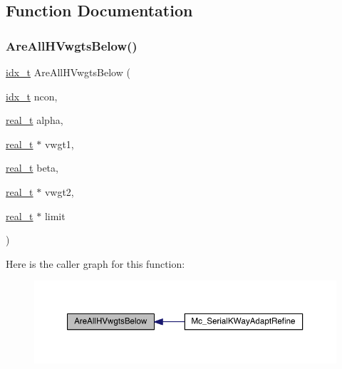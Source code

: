 \subsection{Function Documentation}
\mbox{\label{a00407_ace02f7278bd27e41cf76dd1d4bac9a80}} 
\subsubsection{\texorpdfstring{Are\+All\+H\+Vwgts\+Below()}{AreAllHVwgtsBelow()}}
{\footnotesize\ttfamily \hyperlink{a00876_aaa5262be3e700770163401acb0150f52}{idx\+\_\+t} Are\+All\+H\+Vwgts\+Below (\begin{DoxyParamCaption}\item[{\hyperlink{a00876_aaa5262be3e700770163401acb0150f52}{idx\+\_\+t}}]{ncon,  }\item[{\hyperlink{a00876_a1924a4f6907cc3833213aba1f07fcbe9}{real\+\_\+t}}]{alpha,  }\item[{\hyperlink{a00876_a1924a4f6907cc3833213aba1f07fcbe9}{real\+\_\+t} $\ast$}]{vwgt1,  }\item[{\hyperlink{a00876_a1924a4f6907cc3833213aba1f07fcbe9}{real\+\_\+t}}]{beta,  }\item[{\hyperlink{a00876_a1924a4f6907cc3833213aba1f07fcbe9}{real\+\_\+t} $\ast$}]{vwgt2,  }\item[{\hyperlink{a00876_a1924a4f6907cc3833213aba1f07fcbe9}{real\+\_\+t} $\ast$}]{limit }\end{DoxyParamCaption})}

Here is the caller graph for this function\+:\nopagebreak
\begin{figure}[H]
\begin{center}
\leavevmode
\includegraphics[width=350pt]{a00407_ace02f7278bd27e41cf76dd1d4bac9a80_icgraph}
\end{center}
\end{figure}
\mbox{\label{a00407_aac7dc6996b9a0fa1725d5fb832c83f6d}} 
